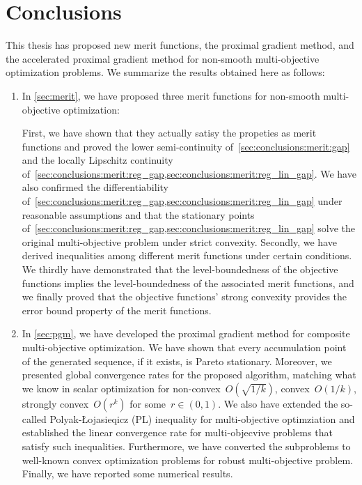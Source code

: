 \documentclass[../main]{subfiles}
\begin{document}
\chapter{Conclusions} \label{sec:conclusions}
This thesis has proposed new merit functions, the proximal gradient method, and the accelerated proximal gradient method for non-smooth multi-objective optimization problems.
We summarize the results obtained here as follows:
\begin{enumerate}
    \item In \cref{sec:merit}, we have proposed three merit functions for non-smooth multi-objective optimization:
        First, we have shown that they actually satisy the propeties as merit functions and proved the lower semi-continuity of~\cref{sec:conclusions:merit:gap} and the locally Lipschitz continuity of~\cref{sec:conclusions:merit:reg_gap,sec:conclusions:merit:reg_lin_gap}.
        We have also confirmed the differentiability of~\cref{sec:conclusions:merit:reg_gap,sec:conclusions:merit:reg_lin_gap} under reasonable assumptions and that the stationary points of~\cref{sec:conclusions:merit:reg_gap,sec:conclusions:merit:reg_lin_gap} solve the original multi-objective problem under strict convexity.
        Secondly, we have derived inequalities among different merit functions under certain conditions.
        We thirdly have demonstrated that the level-boundedness of the objective functions implies the level-boundedness of the associated merit functions, and we finally proved that the objective functions' strong convexity provides the error bound property of the merit functions.

    \item In \cref{sec:pgm}, we have developed the proximal gradient method for composite multi-objective optimization.
        We have shown that every accumulation point of the generated sequence, if it exists, is Pareto stationary.
        Moreover, we presented global convergence rates for the proposed algorithm, matching what we know in scalar optimization for non-convex~$O(\sqrt{1 / k})$, convex~$O(1 / k)$, strongly convex~$O(r^k)$ for some~$r \in (0, 1)$.
        We also have extended the so-called Polyak-{\L}ojasieqicz (PL) inequality for multi-objective optimziation and established the linear convergence rate for multi-objecvive problems that satisfy such inequalities.
        Furthermore, we have converted the subproblems to well-known convex optimization problems for robust multi-objective problem.
        Finally, we have reported some numerical results.


\end{enumerate}
\end{document}
